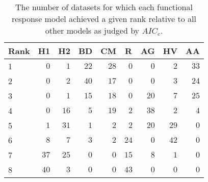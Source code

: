 \begin{table}[!tbp]
\caption{The number of datasets for which each functional response model achieved a given rank relative to all other models as judged by $AIC_c$.\label{table:AICc_rankings}} 
\begin{center}
\begin{tabular}{lrrrrrrrr}
\hline\hline
\multicolumn{1}{l}{Rank}&\multicolumn{1}{c}{H1}&\multicolumn{1}{c}{H2}&\multicolumn{1}{c}{BD}&\multicolumn{1}{c}{CM}&\multicolumn{1}{c}{R}&\multicolumn{1}{c}{AG}&\multicolumn{1}{c}{HV}&\multicolumn{1}{c}{AA}\tabularnewline
\hline
1&$ 0$&$ 1$&$22$&$28$&$ 0$&$ 0$&$ 2$&$33$\tabularnewline
2&$ 0$&$ 2$&$40$&$17$&$ 0$&$ 0$&$ 3$&$24$\tabularnewline
3&$ 0$&$ 1$&$15$&$18$&$ 0$&$20$&$ 7$&$25$\tabularnewline
4&$ 0$&$16$&$ 5$&$19$&$ 2$&$38$&$ 2$&$ 4$\tabularnewline
5&$ 1$&$31$&$ 1$&$ 2$&$ 2$&$20$&$29$&$ 0$\tabularnewline
6&$ 8$&$ 7$&$ 3$&$ 2$&$24$&$ 0$&$42$&$ 0$\tabularnewline
7&$37$&$25$&$ 0$&$ 0$&$15$&$ 8$&$ 1$&$ 0$\tabularnewline
8&$40$&$ 3$&$ 0$&$ 0$&$43$&$ 0$&$ 0$&$ 0$\tabularnewline
\hline
\end{tabular}\end{center}
\end{table}
